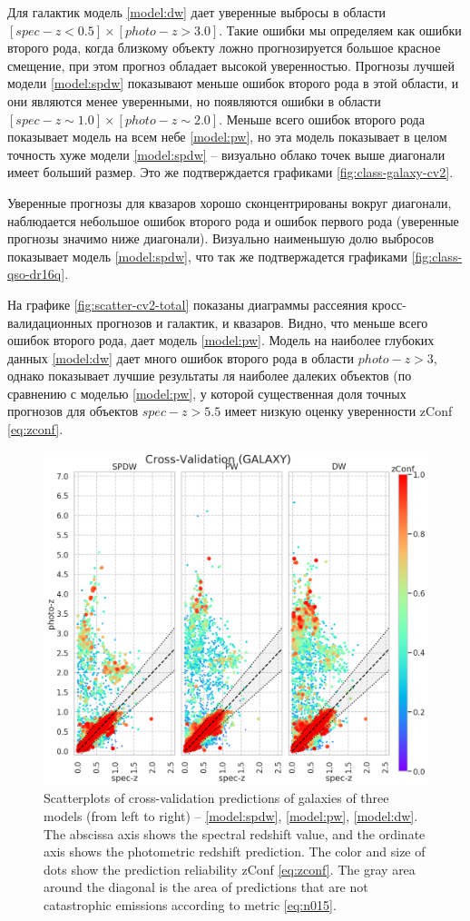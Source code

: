 \documentclass[fleqn,usenatbib]{mnras}
\begin{document}
Для галактик модель \ref{model:dw} дает уверенные выбросы в области $[spec-z < 0.5] \times [photo-z > 3.0]$. Такие ошибки мы определяем как ошибки второго рода, когда близкому объекту ложно прогнозируется большое красное смещение, при этом прогноз обладает высокой уверенностью. Прогнозы лучшей модели \ref{model:spdw} показывают меньше ошибок второго рода в этой области, и они являются менее уверенными, но появляются ошибки в области $[spec-z \sim 1.0] \times [photo-z \sim 2.0]$. Меньше всего ошибок второго рода показывает модель на всем небе \ref{model:pw}, но эта модель показывает в целом точность хуже модели \ref{model:spdw} -- визуально облако точек выше диагонали имеет больший размер. Это же подтверждается графиками \ref{fig:class-galaxy-cv2}.

Уверенные прогнозы для квазаров хорошо сконцентрированы вокруг диагонали, наблюдается небольшое ошибок второго рода и ошибок первого рода (уверенные прогнозы значимо ниже диагонали). Визуально наименьшую долю выбросов показывает модель \ref{model:spdw}, что так же подтвержадется графиками \ref{fig:class-qso-dr16q}.

На графике \ref{fig:scatter-cv2-total} показаны диаграммы рассеяния кросс-валидационных прогнозов и галактик, и квазаров. Видно, что меньше всего ошибок второго рода, дает модель \ref{model:pw}. Модель на наиболее глубоких данных \ref{model:dw} дает много ошибок второго рода в области $photo-z > 3$, однако показывает лучшие результаты ля наиболее далеких объектов (по сравнению с моделью \ref{model:pw}, у которой существенная доля точных прогнозов для объектов $spec-z > 5.5$ имеет низкую оценку уверенности zConf \ref{eq:zconf}.

\begin{figure}
    \centering
    \includegraphics[width=0.55\linewidth]{images/scatterplots-cv2-gal-sorted.png}
    \caption{Scatterplots of cross-validation predictions of galaxies of three models (from left to right) -- \ref{model:spdw}, \ref{model:pw}, \ref{model:dw}. The abscissa axis shows the spectral redshift value, and the ordinate axis shows the photometric redshift prediction. The color and size of dots show the prediction reliability zConf \eqref{eq:zconf}. The gray area around the diagonal is the area of predictions that are not catastrophic emissions according to metric \eqref{eq:n015}.}
    \label{fig:scatter-cv2-gal}
\end{figure}
\end{document}
